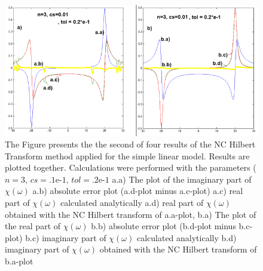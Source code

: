 \documentclass[12pt,twoside,a4paper]{article}
\numberwithin{equation}{subsection}
\numberwithin{figure}{subsection}
\begin{document}
\begin{figure}
  \includegraphics[width=150mm]{img/nc_lin2.png}
  \caption{ The Figure presents the the second of four results of the NC Hilbert Transform method applied for the simple linear model.
  Results are plotted together. Calculations were performed with the parameters ($n=3, \,cs=\mbox{.1e-1}, \,tol=\mbox{.2e-1}$
     a.a) The plot of the imaginary part of $\chi (\omega )$
     a.b) absolute error plot (a.d-plot minus a.c-plot) 
     a.c) real part of $\chi (\omega )$ calculated analytically 
     a.d) real part of $\chi (\omega )$ obtained with the NC Hilbert transform of a.a-plot, 
     b.a) The plot of the real part of $\chi (\omega )$
     b.b) absolute error plot (b.d-plot minus b.c-plot)
     b.c) imaginary part of $\chi (\omega )$ calculated analytically 
     b.d) imaginary part of $\chi (\omega )$ obtained with the NC Hilbert transform of b.a-plot
     \label{fig:nc_lin2} 
  }
\end{figure}  
\end{document}
